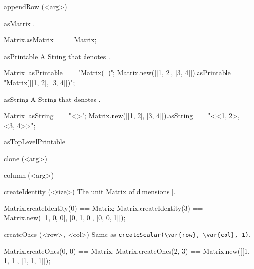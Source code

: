 \begin{urbiscriptapi}
\item[appendRow](<arg>)%
\begin{urbiassert}

\end{urbiassert}

\item[asMatrix]%
  \this.
\begin{urbiassert}
Matrix.asMatrix === Matrix;
\end{urbiassert}

\item[asPrintable]%
  A String that denotes \this.
\begin{urbiassert}
Matrix                      .asPrintable == "Matrix([])";
Matrix.new([[1, 2], [3, 4]]).asPrintable == "Matrix([[1, 2], [3, 4]])";
\end{urbiassert}

\item[asString]%
  A String that denotes \this.
\begin{urbiassert}
Matrix                      .asString == "<>";
Matrix.new([[1, 2], [3, 4]]).asString == "<<1, 2>, <3, 4>>";
\end{urbiassert}

\item[asTopLevelPrintable]%
\begin{urbiassert}

\end{urbiassert}

\item[clone](<arg>)%
\begin{urbiassert}

\end{urbiassert}

\item[column](<arg>)%
\begin{urbiassert}

\end{urbiassert}

\item[createIdentity](<size>)%
  The unit Matrix of dimensions |.
\begin{urbiassert}
Matrix.createIdentity(0) == Matrix;
Matrix.createIdentity(3) == Matrix.new([[1, 0, 0], [0, 1, 0], [0, 0, 1]]);
\end{urbiassert}

\item[createOnes](<row>, <col>)%
  Same as \lstinline|createScalar(\var{row}, \var{col}, 1)|.
\begin{urbiassert}
Matrix.createOnes(0, 0) == Matrix;
Matrix.createOnes(2, 3) == Matrix.new([[1, 1, 1], [1, 1, 1]]);
\end{urbiassert}


\end{urbiscriptapi}
